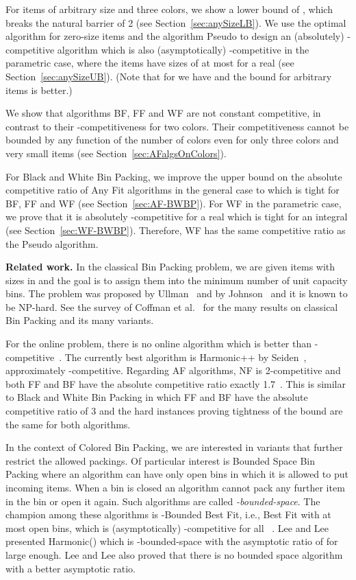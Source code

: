 \documentclass[11pt,a4paper]{article}
\begin{document}
For items of arbitrary size and three colors, we show a lower bound of
, which breaks the natural barrier of 2 (see Section~\ref{sec:anySizeLB}).
We use the optimal algorithm for zero-size items and the algorithm Pseudo to design an
(absolutely) -competitive algorithm which is also
(asymptotically) -competitive in the parametric case,
where the items have sizes of at most  for a real 
(see Section~\ref{sec:anySizeUB}). (Note
that for  we have  and the bound for arbitrary items
is better.)

We show that algorithms BF, FF and WF are not
constant competitive, in contrast to their -competitiveness for two colors.
Their competitiveness cannot be
bounded by any function of the number of colors even for only three
colors and very small items (see Section~\ref{sec:AFalgsOnColors}).

For Black and White Bin Packing,
we improve the upper bound on the
absolute competitive ratio of Any Fit algorithms in the general case
to  which is tight for BF, FF and WF (see Section~\ref{sec:AF-BWBP}).  For WF in the parametric
case, we prove that it is absolutely -competitive for a real 
which is tight for an integral  (see Section~\ref{sec:WF-BWBP}).
Therefore, WF has the same competitive ratio as the Pseudo algorithm.

\medskip

\textbf{Related work.}
In the classical Bin Packing problem, we are given items with sizes in
 and the goal is to assign them into the minimum number of
unit capacity bins. The problem was proposed by
Ullman~\cite{ullman71} and by Johnson~\cite{johnson73} and it is
known to be NP-hard. See the survey of Coffman et al.~\cite{coffman13} for the many
results on classical Bin Packing and its many variants.

For the online problem, there is no online algorithm which is better
than -competitive~\cite{balogh12}.  The
currently best algorithm is Harmonic++ by Seiden~\cite{seiden02},
approximately -competitive.  Regarding AF algorithms, NF is
2-competitive and both FF and BF have the absolute competitive ratio
exactly 1.7~\cite{dosa13,dosa14}.  This is similar to Black and White
Bin Packing in which FF and BF have the absolute competitive ratio of 3
and the hard instances proving tightness of the bound are the same for
both algorithms.

In the context of Colored Bin Packing, we are interested in variants
that further restrict the allowed packings. Of particular interest is
Bounded Space Bin Packing where an algorithm can have only 
open bins in which it is allowed to put incoming items.  When a bin is
closed an algorithm cannot pack any further item in the bin or open it
again.  Such algorithms are called \textit{-bounded-space}. The
champion among these algorithms is -Bounded Best Fit, i.e., Best
Fit with at most  open bins, which is (asymptotically)
-competitive for all ~\cite{csirik01}.  Lee and
Lee~\cite{lee85} presented Harmonic() which is -bounded-space
with the asymptotic ratio of  for  large enough. Lee and Lee also
proved that there is no bounded space algorithm with a better asymptotic
ratio.
\end{document}
